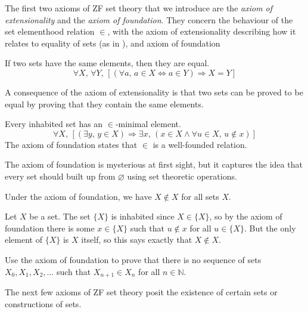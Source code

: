 \todo{}

The first two axioms of ZF set theory that we introduce are the \textit{axiom of extensionality} and the \textit{axiom of foundation}. They concern the behaviour of the set elementhood relation $\in$, with the axiom of extensionality describing how it relates to equality of sets (as in ), and axiom of foundation 

\begin{axiom}
\label{axZFCExtensionality}
If two sets have the same elements, then they are equal.
\[ \forall X,\, \forall Y,\, [(\forall a,\, a \in X \Leftrightarrow a \in Y) \Rightarrow X=Y] \]
\end{axiom}

A consequence of the axiom of extensionality is that two sets can be proved to be equal by proving that they contain the same elements.

\begin{axiom}
Every inhabited set has an $\in$-minimal element.
\[ \forall X,\, [(\exists y,\, y \in X) \Rightarrow \exists x,\, (x \in X \wedge \forall u \in X,\, u \not \in x)] \]
The axiom of foundation states that $\in$ is a well-founded relation.
\end{axiom}

The axiom of foundation is mysterious at first sight, but it captures the idea that every set should built up from $\varnothing$ using set theoretic operations.

\begin{lemma}
Under the axiom of foundation, we have $X \not \in X$ for all sets $X$.
\end{lemma}

\begin{cproof}
Let $X$ be a set. The set $\{ X \}$ is inhabited since $X \in \{ X \}$, so by the axiom of foundation there is some $x \in \{ X \}$ such that $u \not\in x$ for all $u \in \{ X \}$. But the only element of $\{ X \}$ is $X$ itself, so this says exactly that $X \not\in X$.
\end{cproof}

\begin{exercise}
\label{exStrictlyDecreasingSequenceOfSets}
Use the axiom of foundation to prove that there is no sequence of sets $X_0,X_1,X_2,\dots$ such that $X_{n+1} \in X_n$ for all $n \in \mathbb{N}$.
\end{exercise}

The next few axioms of ZF set theory posit the existence of certain sets or constructions of sets.

